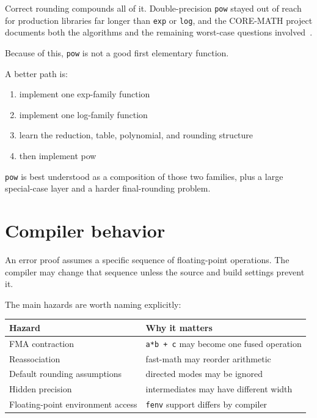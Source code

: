 \documentclass[manuscript, nonacm]{acmart}
\begin{document}
    Correct rounding compounds all of it. Double-precision \texttt{pow}
    stayed out of reach for production libraries far longer than \texttt{exp}
    or \texttt{log}, and the CORE-MATH project documents both the algorithms
    and the remaining worst-case questions involved~\cite{coremathpaper}.

    Because of this, \texttt{pow} is not a good first elementary function.

    A better path is:

    \begin{enumerate}
        \item implement one exp-family function
        \item implement one log-family function
        \item learn the reduction, table, polynomial, and rounding structure
        \item then implement pow
    \end{enumerate}

    \texttt{pow} is best understood as a composition of those two families, plus
    a large special-case layer and a harder final-rounding problem.



    \section{Compiler behavior}
    \label{sec:compiler}

    An error proof assumes a specific sequence of floating-point operations. The
    compiler may change that sequence unless the source and build settings prevent
    it.

    The main hazards are worth naming explicitly:

    \begin{table}[H]
        \centering
        \begin{tabular}{ll}
            \toprule
            Hazard                            & Why it matters                                  \\
            \midrule
            FMA contraction                   & \texttt{a*b + c} may become one fused operation \\
            Reassociation                     & fast-math may reorder arithmetic                \\
            Default rounding assumptions      & directed modes may be ignored                   \\
            Hidden precision                  & intermediates may have different width          \\
            Floating-point environment access & \texttt{fenv} support differs by compiler       \\
            \bottomrule
        \end{tabular}
    \end{table}
\end{document}
